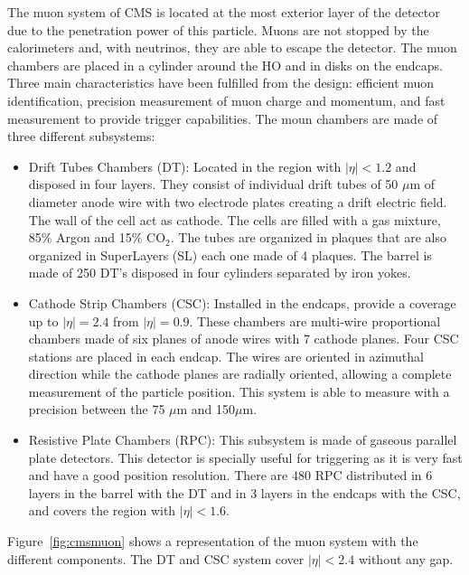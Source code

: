 The muon system of CMS is located at the most exterior layer of the detector  due to the penetration power of this particle. Muons are not stopped by the calorimeters and, with neutrinos, they are able to escape the detector. The muon chambers are placed in a cylinder around the HO and in disks on the endcaps. Three main characteristics have been fulfilled from the design: efficient muon identification, precision measurement of muon charge and momentum, and fast measurement to provide trigger capabilities. The moun chambers are made of three different subsystems:
\begin{itemize}
\item Drift Tubes Chambers (DT): Located in the region with $|\eta|<1.2$ and disposed in four layers. They consist of individual drift tubes of 50 $\mu$m of diameter anode wire with two electrode plates creating a drift electric field. The wall of the cell act as cathode. The cells are filled with a gas mixture, 85\% Argon and 15\% $\text{CO}_{2}$. The tubes are organized in plaques that are also organized in SuperLayers (SL) each one made of 4 plaques. The barrel is made of 250 DT's disposed in four cylinders separated by iron yokes. 
\item Cathode Strip Chambers (CSC): Installed in the endcaps, provide a coverage up to $|\eta|=2.4$ from $|\eta|=0.9$. These chambers are multi-wire proportional chambers made of six planes of anode wires with 7 cathode planes. Four CSC stations are placed in each endcap. The wires are oriented in azimuthal direction while the cathode planes are radially oriented, allowing a complete measurement of the particle position. This system is able to measure with a precision between the 75 $\mu$m and 150$\mu$m.
\item Resistive Plate Chambers (RPC): This subsystem is made of gaseous parallel plate detectors. This detector is specially useful for triggering as it is very fast and have a good position resolution. There are 480 RPC distributed in 6 layers in the barrel with the DT and in 3 layers in the endcaps with the CSC, and covers the region with $|\eta|<1.6$. 
\end{itemize}

Figure~\ref{fig:cmsmuon} shows a representation of the muon system with the different components. The DT and CSC system cover $|\eta|<2.4$ without any gap. 

